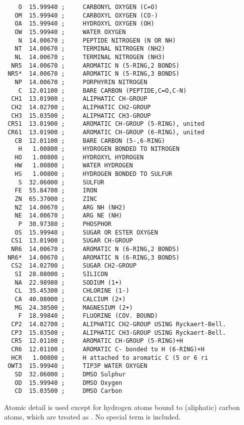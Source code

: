 {\small\begin{verbatim}
    O  15.99940 ;     CARBONYL OXYGEN (C=O)              
   OM  15.99940 ;     CARBOXYL OXYGEN (CO-)              
   OA  15.99940 ;     HYDROXYL OXYGEN (OH)               
   OW  15.99940 ;     WATER OXYGEN                       
    N  14.00670 ;     PEPTIDE NITROGEN (N OR NH)         
   NT  14.00670 ;     TERMINAL NITROGEN (NH2)            
   NL  14.00670 ;     TERMINAL NITROGEN (NH3)            
  NR5  14.00670 ;     AROMATIC N (5-RING,2 BONDS)        
 NR5*  14.00670 ;     AROMATIC N (5-RING,3 BONDS)        
   NP  14.00670 ;     PORPHYRIN NITROGEN                 
    C  12.01100 ;     BARE CARBON (PEPTIDE,C=O,C-N)      
  CH1  13.01900 ;     ALIPHATIC CH-GROUP                 
  CH2  14.02700 ;     ALIPHATIC CH2-GROUP                
  CH3  15.03500 ;     ALIPHATIC CH3-GROUP                
 CR51  13.01900 ;     AROMATIC CH-GROUP (5-RING), united 
 CR61  13.01900 ;     AROMATIC CH-GROUP (6-RING), united 
   CB  12.01100 ;     BARE CARBON (5-,6-RING)            
    H   1.00800 ;     HYDROGEN BONDED TO NITROGEN        
   HO   1.00800 ;     HYDROXYL HYDROGEN                  
   HW   1.00800 ;     WATER HYDROGEN                     
   HS   1.00800 ;     HYDROGEN BONDED TO SULFUR          
    S  32.06000 ;     SULFUR                             
   FE  55.84700 ;     IRON                               
   ZN  65.37000 ;     ZINC                               
   NZ  14.00670 ;     ARG NH (NH2)                       
   NE  14.00670 ;     ARG NE (NH)                        
    P  30.97380 ;     PHOSPHOR                           
   OS  15.99940 ;     SUGAR OR ESTER OXYGEN              
  CS1  13.01900 ;     SUGAR CH-GROUP                     
  NR6  14.00670 ;     AROMATIC N (6-RING,2 BONDS)        
 NR6*  14.00670 ;     AROMATIC N (6-RING,3 BONDS)        
  CS2  14.02700 ;     SUGAR CH2-GROUP                    
   SI  28.08000 ;     SILICON                            
   NA  22.98980 ;     SODIUM (1+)                        
   CL  35.45300 ;     CHLORINE (1-)                      
   CA  40.08000 ;     CALCIUM (2+)                       
   MG  24.30500 ;     MAGNESIUM (2+)                     
    F  18.99840 ;     FLUORINE (COV. BOUND)              
  CP2  14.02700 ;     ALIPHATIC CH2-GROUP USING Ryckaert-Bell.
  CP3  15.03500 ;     ALIPHATIC CH3-GROUP USING Ryckaert-Bell.
  CR5  12.01100 ;     AROMATIC CH-GROUP (5-RING)+H       
  CR6  12.01100 ;     AROMATIC C- bonded to H (6-RING)+H 
  HCR   1.00800 ;     H attached to aromatic C (5 or 6 ri
 OWT3  15.99940 ;     TIP3P WATER OXYGEN                 
   SD  32.06000 ;     DMSO Sulphur                       
   OD  15.99940 ;     DMSO Oxygen                        
   CD  15.03500 ;     DMSO Carbon                        
\end{verbatim}}
Atomic detail is used except for hydrogen atoms bound to (aliphatic)
carbon atoms, which are treated as {\em {}}. No
special  term is included.

